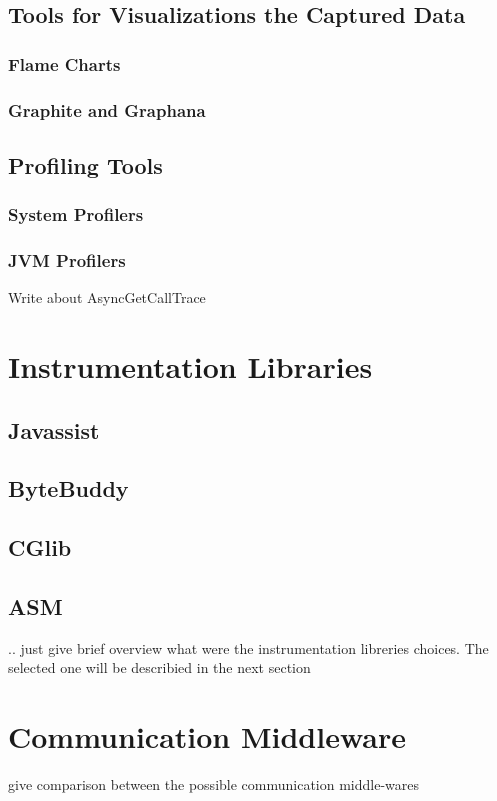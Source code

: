 \subsection{Tools for Visualizations the Captured Data}
\subsubsection{Flame Charts}
\subsubsection{Graphite and Graphana}
\subsection{Profiling Tools}
\subsubsection{System Profilers}
\subsubsection{JVM Profilers}
Write about AsyncGetCallTrace



\section{Instrumentation Libraries}
\subsection{Javassist}
\subsection{ByteBuddy}
\subsection{CGlib}
\subsection{ASM}
.. just give brief overview what were the instrumentation libreries choices. The selected one will be describied in the next section

\section{Communication Middleware}
give comparison between the possible communication middle-wares
